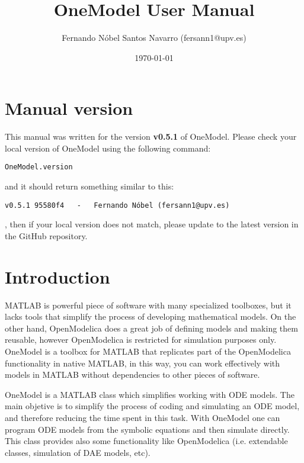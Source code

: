\documentclass[11pt]{article}
\title{OneModel User Manual}
\author{Fernando Nóbel Santos Navarro (fersann1@upv.es)}
\date{\today}
\begin{document}
\maketitle

\tableofcontents

\newpage 

\setlength{\parskip}{0.5em}

\section{Manual version}

This manual was written for the version \textbf{ 
v0.5.1
} of OneModel. Please check your local version of OneModel using the following command:

\begin{lstlisting}
OneModel.version
\end{lstlisting}

and it should return something similar to this:

\begin{lstlisting}
v0.5.1 95580f4   -   Fernando Nóbel (fersann1@upv.es)\end{lstlisting}
, then if your local version does not match, please update to the latest version in the GitHub repository.

\section{Introduction}

MATLAB is powerful piece of software with many specialized toolboxes, but it lacks tools that simplify the process of developing mathematical models.
On the other hand, OpenModelica does a great job of defining models and making them reusable, however OpenModelica is restricted for simulation purposes only.
OneModel is a toolbox for MATLAB that replicates part of the OpenModelica functionality in native MATLAB, in this way, you can work effectively with models in MATLAB without dependencies to other pieces of software.

OneModel is a MATLAB class which simplifies working with ODE models. The main objetive is to simplify the process of coding and simulating an ODE model, and therefore reducing the time spent in this task. With OneModel one can program ODE models from the symbolic equations and then simulate directly. This class provides also some functionality like OpenModelica (i.e. extendable classes, simulation of DAE models, etc).
\end{document}
